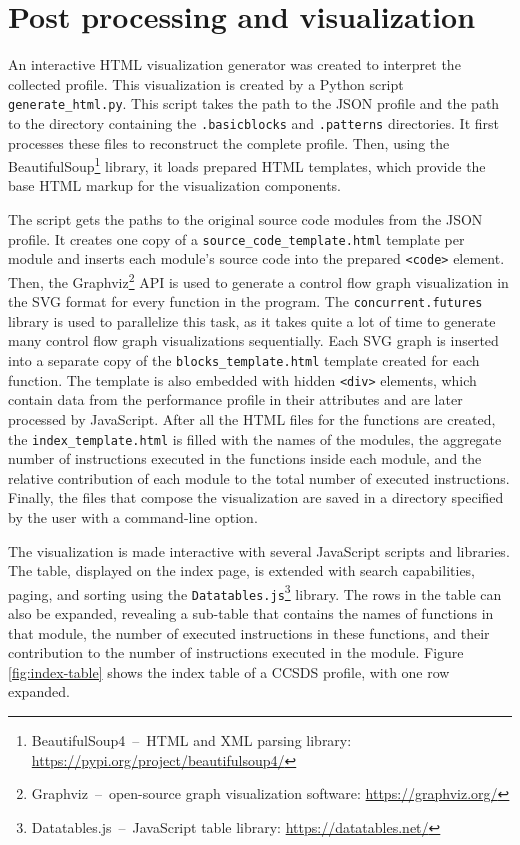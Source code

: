 \chapter{Post processing and visualization}
\label{visualizations}


An interactive HTML visualization generator was created to interpret the collected profile. This visualization is created by a Python script \texttt{generate\_html.py}. This script takes the path to the JSON profile and the path to the directory containing the \texttt{.basicblocks} and \texttt{.patterns} directories. It first processes these files to reconstruct the complete profile. Then, using the BeautifulSoup\footnote{BeautifulSoup4 \,--\, HTML and XML parsing library: \url{https://pypi.org/project/beautifulsoup4/}} library, it loads prepared HTML templates, which provide the base HTML markup for the visualization components.

The script gets the paths to the original source code modules from the JSON profile. It creates one copy of a \texttt{source\_code\_template.html} template per module and inserts each module's source code into the prepared \texttt{<code>} element. Then, the Graphviz\footnote{Graphviz \,--\, open-source graph visualization software: \url{https://graphviz.org/}} API is used to generate a control flow graph visualization in the SVG format for every function in the program. The \texttt{concurrent.futures} library is used to parallelize this task, as it takes quite a lot of time to generate many control flow graph visualizations sequentially. Each SVG graph is inserted into a separate copy of the \texttt{blocks\_template.html} template created for each function. The template is also embedded with hidden \texttt{<div>} elements, which contain data from the performance profile in their attributes and are later processed by JavaScript. After all the HTML files for the functions are created, the \texttt{index\_template.html} is filled with the names of the modules, the aggregate number of instructions executed in the functions inside each module, and the relative contribution of each module to the total number of executed instructions. Finally, the files that compose the visualization are saved in a directory specified by the user with a command-line option.

The visualization is made interactive with several JavaScript scripts and libraries. The table, displayed on the index page, is extended with search capabilities, paging, and sorting using the \texttt{Datatables.js}\footnote{Datatables.js \,--\, JavaScript table library: \url{https://datatables.net/}} library. The rows in the table can also be expanded, revealing a sub-table that contains the names of functions in that module, the number of executed instructions in these functions, and their contribution to the number of instructions executed in the module. Figure \ref{fig:index-table} shows the index table of a CCSDS profile, with one row expanded.

